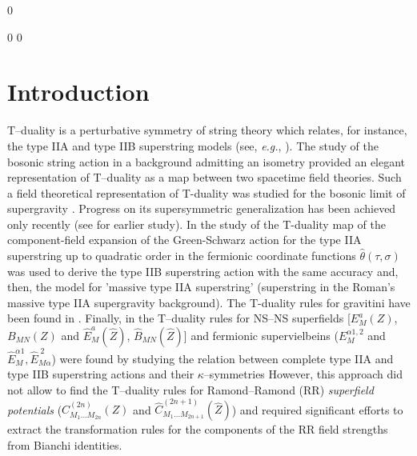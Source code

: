 \documentclass[a4paper,11pt]{article}
\begin{document}
\bigskip




\setcounter{page}0 

\newpage
\renewcommand{\thefootnote}{\arabic{footnote}}
\setcounter{footnote}0
\renewcommand{\theequation}{\arabic{section}.\arabic{equation}} 
\setcounter{equation}0



\section{Introduction}

T--duality is a perturbative symmetry of string theory which relates, 
for instance, the  
type IIA and type IIB superstring models (see, {\it e.g.}, \cite{Polch0}). 
The study of the bosonic string action in a 
background 
admitting an isometry \cite{buscher} provided an elegant representation 
of T--duality as a map between two spacetime
field theories. Such a field theoretical representation of 
T-duality was studied for the  bosonic limit of supergravity 
\cite{duff1,bho,bdr,ght,hull,lozano,myers,simon}. 
Progress on its supersymmetric generalization has been achieved only 
recently \cite{clps,hassan,kulik} (see \cite{siegel,bakas} for earlier
study). 
In \cite{clps} the study of the T-duality map of the 
component-field expansion of the Green-Schwarz action for the type IIA 
superstring up to quadratic order in the fermionic coordinate functions 
$\hat{\theta}(\tau,\sigma)$ 
was used to derive the type IIB superstring action with 
the same accuracy and, then, the model for 'massive type IIA superstring' 
(superstring in the Roman's massive type IIA  supergravity background). 
The T-duality rules for gravitini have been found in \cite{hassan}. 
Finally, in \cite{kulik} the  T--duality rules 
for NS--NS superfields [$E_M^a(Z)$, $B_{MN}(Z)$ and 
$\hat{E}_M^a(\hat{Z})$, $\hat{B}_{MN}(\hat{Z})$] 
and fermionic supervielbeins ($E_M^{\alpha 1, 2}$ and 
$\hat{E}_M^{\alpha 1}, \hat{E}_{M\alpha}^{\; 2}$) 
were found by studying the relation between complete 
type IIA and type IIB superstring actions and their $\kappa$--symmetries
However, this approach did not allow to find the T--duality rules for 
Ramond--Ramond (RR) {\sl superfield potentials} 
($C^{(2n)}_{M_1\ldots M_{2n}}(Z)$ and $
\hat{C}^{(2n+1)}_{M_1\ldots M_{2n+1}}(\hat{Z})$)
and required significant efforts to extract the transformation rules for the 
 components of the RR field strengths from Bianchi identities. 
\end{document}

